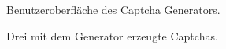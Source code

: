 \begin{figure}[htbp]
  \centering
  \caption{Benutzeroberfläche des Captcha Generators.}
  \label{Captchas}
\end{figure}

\begin{figure}[htbp]
  \centering
  \caption{Drei mit dem Generator erzeugte Captchas.}
  \label{Captchas}
\end{figure}
